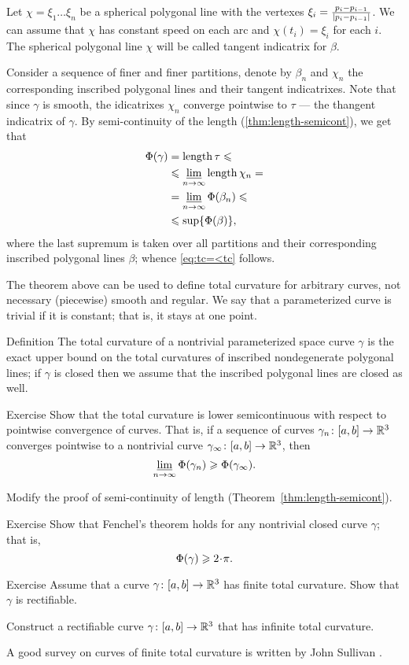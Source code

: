 Let $\chi=\xi_1\dots\xi_n$ be a spherical polygonal line
with the vertexes $\xi_i\z=\tfrac{p_i-p_{i-1}}{|p_i-p_{i-1}|}$.
We can assume that $\chi$ has constant speed on each arc and $\chi(t_i)=\xi_i$ for each $i$. 
The spherical polygonal line $\chi$ will be called tangent indicatrix for $\beta$.

Consider a sequence of finer and finer partitions, denote by $\beta_n$ and $\chi_n$ the corresponding inscribed polygonal lines and their tangent indicatrixes.
Note that since $\gamma$ is smooth, the idicatrixes $\chi_n$ converge pointwise to $\tau$ --- the thangent indicatrix of $\gamma$.
By semi-continuity of the length (\ref{thm:length-semicont}), we get that  
\begin{align*}
\Phi({\gamma})&=\mathop{\rm length}\nolimits \tau\leqslant  
\\
&\leqslant \varliminf_{n\to\infty}\mathop{\rm length}\nolimits \chi_n=
\\
&= \varliminf_{n\to\infty}\Phi({\beta_n})\leqslant
\\
&\leqslant \sup\{\Phi({\beta})\},
\end{align*}
where the last supremum is taken over all partitions and their corresponding inscribed polygonal lines $\beta$; whence \ref{eq:tc=<tc} follows.
\qeds

The theorem above can be used to define total curvature for arbitrary curves, not necessary (piecewise) smooth and regular. 
We say that a parameterized curve is trivial if it is constant; that is, it stays at one point.

\begin{thm}{Definition}\label{def:total-curv-poly}
The total curvature of a nontrivial parameterized space curve $\gamma$ is the exact upper bound on the total curvatures of inscribed nondegenerate polygonal lines;
if $\gamma$ is closed then we assume that the inscribed polygonal lines are closed as well.
\end{thm}

\begin{thm}{Exercise}
Show that the total curvature is lower semicontinuous with respect to pointwise convergence of curves.
That is, if a sequence
of curves $\gamma_n\colon[a,b]\to \mathbb{R}^3$ converges pointwise 
to a nontrivial curve $\gamma_\infty\:[a,b]\z\to \RR^3$, then 
\[\varliminf_{n\to\infty} \Phi({\gamma_n}) \geqslant \Phi({\gamma_\infty}).\]
\end{thm}

 Modify the proof of semi-continuity of length (Theorem~\ref{thm:length-semicont}).

\begin{thm}{Exercise}
Show that Fenchel's theorem holds for any nontrivial closed curve $\gamma$;
that is, 
\[\tc\gamma\ge2\cdot\pi.\]
\end{thm}

\begin{thm}{Exercise} 
Assume that a curve $\gamma\colon[a,b]\to\mathbb{R}^3$ has finite total curvature.
Show that $\gamma$ is rectifiable.

Construct a rectifiable curve $\gamma\colon[a,b]\to\mathbb{R}^3$ that has infinite total curvature.
\end{thm}

A good survey on curves of finite total curvature is written by John Sullivan \cite{sullivan-curves}.


